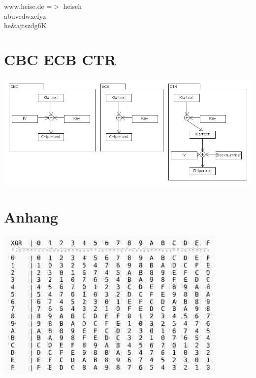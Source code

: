\documentclass[12pt,a4paper,oneside,ngerman]{article}
\begin{document}
www.heise.de =$>$ heiseh\\
abuvcdwxefyz\\
he\&ajtszdg6K\\

\section{CBC ECB CTR}
\includegraphics[scale=0.5]{cbc_ecb_ctr.png}

\section{Anhang}

\includegraphics[scale=0.8]{xor.jpg}




\end{document}
